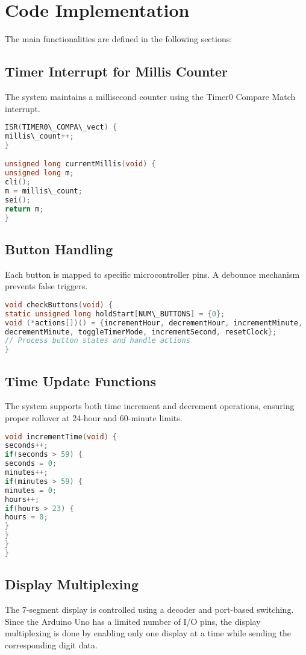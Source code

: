 \documentclass{article}
\begin{document}
\section{Code Implementation}
The main functionalities are defined in the following sections:

\subsection{Timer Interrupt for Millis Counter}
The system maintains a millisecond counter using the Timer0 Compare Match interrupt.

\begin{lstlisting}[language=C, caption=Millis Timer Interrupt, basicstyle=\ttfamily, keywordstyle=\color{blue}]
ISR(TIMER0\_COMPA\_vect) {
millis\_count++;
}

unsigned long currentMillis(void) {
unsigned long m;
cli();
m = millis\_count;
sei();
return m;
}
\end{lstlisting}

\subsection{Button Handling}
Each button is mapped to specific microcontroller pins. A debounce mechanism prevents false triggers.

\begin{lstlisting}[language=C, caption=Button Checking Function]
void checkButtons(void) {
static unsigned long holdStart[NUM\_BUTTONS] = {0};
void (*actions[])() = {incrementHour, decrementHour, incrementMinute,
decrementMinute, toggleTimerMode, incrementSecond, resetClock};
// Process button states and handle actions
}
\end{lstlisting}

\subsection{Time Update Functions}
The system supports both time increment and decrement operations, ensuring proper rollover at 24-hour and 60-minute limits.

\begin{lstlisting}[language=C, caption=Increment Time]
void incrementTime(void) {
seconds++;
if(seconds > 59) {
seconds = 0;
minutes++;
if(minutes > 59) {
minutes = 0;
hours++;
if(hours > 23) {
hours = 0;
}
}
}
}
\end{lstlisting}

\subsection{Display Multiplexing}
The 7-segment display is controlled using a decoder and port-based switching. Since the Arduino Uno has a limited number of I/O pins, the display multiplexing is done by enabling only one display at a time while sending the corresponding digit data.
\end{document}

